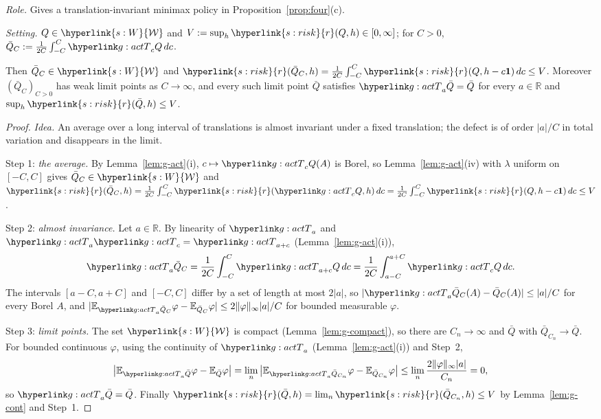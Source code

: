 \documentclass[11pt]{article}
\DeclareRobustCommand{\sy}[2]{{\hyperlink{#1}{#2}}}
\newcommand{\R}{\mathbb{R}}
\newcommand{\E}{\mathbb{E}}
\newcommand{\1}{\mathbf{1}}
\newcommand{\Wc}{\sy{s:W}{\mathcal W}}
\newcommand{\rk}{\sy{s:risk}{r}}
\begin{document}
\begin{lemma}\label{lem:g-avg}
\textit{Role.} Gives a translation-invariant minimax policy in Proposition~\ref{prop:four}(c).

\noindent\textit{Setting.} $Q\in\Wc$ and $V:=\sup_h\rk(Q,h)\in[0,\infty]$; for $C>0$, $\bar Q_C:=\frac1{2C}\int_{-C}^C\gTc_cQ\,dc$.

\noindent Then $\bar Q_C\in\Wc$ and $\rk(\bar Q_C,h)=\frac1{2C}\int_{-C}^C\rk(Q,h-c\1)\,dc\le V$. Moreover $(\bar Q_C)_{C>0}$ has weak limit points as $C\to\infty$, and every
such limit point $\bar Q$ satisfies $\gTc_a\bar Q=\bar Q$ for every $a\in\R$ and $\sup_h\rk(\bar Q,h)\le V$.
\end{lemma}
\begin{proof}
\textit{Idea.} An average over a long interval of translations is almost invariant under a fixed translation; the defect is of order $|a|/C$ in total variation and
disappears in the limit.

Step 1: \emph{the average.} By Lemma~\ref{lem:g-act}(i), $c\mapsto\gTc_cQ(A)$ is Borel, so Lemma~\ref{lem:g-act}(iv) with $\lambda$ uniform on $[-C,C]$ gives $\bar Q_C\in\Wc$ and
$\rk(\bar Q_C,h)=\frac1{2C}\int_{-C}^C\rk(\gTc_cQ,h)\,dc=\frac1{2C}\int_{-C}^C\rk(Q,h-c\1)\,dc\le V$.

Step 2: \emph{almost invariance.} Let $a\in\R$. By linearity of $\gTc_a$ and $\gTc_a\gTc_c=\gTc_{a+c}$ (Lemma~\ref{lem:g-act}(i)),
\[
\gTc_a\bar Q_C=\frac1{2C}\int_{-C}^C\gTc_{a+c}Q\,dc=\frac1{2C}\int_{a-C}^{a+C}\gTc_cQ\,dc .
\]
The intervals $[a-C,a+C]$ and $[-C,C]$ differ by a set of length at most $2|a|$, so $|\gTc_a\bar Q_C(A)-\bar Q_C(A)|\le|a|/C$ for every Borel $A$, and
$|\E_{\gTc_a\bar Q_C}\varphi-\E_{\bar Q_C}\varphi|\le2\|\varphi\|_\infty|a|/C$ for bounded measurable $\varphi$.

Step 3: \emph{limit points.} The set $\Wc$ is compact (Lemma~\ref{lem:g-compact}), so there are $C_n\to\infty$ and $\bar Q$ with $\bar Q_{C_n}\to\bar Q$. For bounded continuous
$\varphi$, using the continuity of $\gTc_a$ (Lemma~\ref{lem:g-act}(i)) and Step~2,
\[
\big|\E_{\gTc_a\bar Q}\varphi-\E_{\bar Q}\varphi\big|=\lim_n\big|\E_{\gTc_a\bar Q_{C_n}}\varphi-\E_{\bar Q_{C_n}}\varphi\big|\le\lim_n\frac{2\|\varphi\|_\infty|a|}{C_n}=0,
\]
so $\gTc_a\bar Q=\bar Q$. Finally $\rk(\bar Q,h)=\lim_n\rk(\bar Q_{C_n},h)\le V$ by Lemma~\ref{lem:g-cont} and Step~1.
\end{proof}
\end{document}
